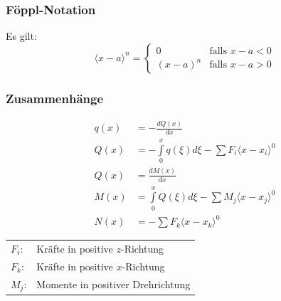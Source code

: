 \documentclass[a4paper,twocolumn,10pt]{article}
\begin{document}
\subsubsection{Föppl-Notation}
Es gilt:
\begin{equation*}
\langle x-a\rangle^n=\begin{cases}0 & \text{falls }x-a<0 \\ (x-a)^n & \text{falls }x-a>0\end{cases}
\end{equation*}

\subsubsection{Zusammenhänge}
\begin{equation*}
\begin{split}
q(x)&=-\frac{dQ(x)}{dx}\\
Q(x)&=-\int\limits_{0}^xq(\xi)d\xi -\sum F_i\langle x-x_i\rangle^0\\
Q(x)&=\frac{dM(x)}{dx}\\
M(x)&=\int\limits_0^x Q(\xi)d\xi -\sum M_j\langle x-x_j\rangle^0\\
N(x)&=-\sum F_k\langle x-x_k\rangle^0
\end{split}
\end{equation*}
\begin{tabular}{ll}
$F_i$: & Kräfte in positive $z$-Richtung\\
$F_k$: & Kräfte in positive $x$-Richtung\\
$M_j$: & Momente in positiver Drehrichtung
\end{tabular}
\end{document}

